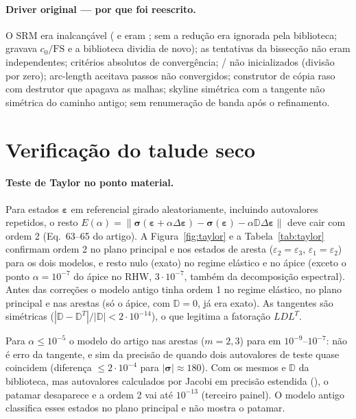 \documentclass[11pt,a4paper]{article}
\newcommand{\sig}{\bm{\sigma}}
\newcommand{\eps}{\bm{\varepsilon}}
\newcommand{\D}{\mathbb{D}}
\begin{document}
\paragraph{Driver original --- por que foi reescrito.} O SRM era inalcançável ( e
 eram ; sem  a redução era ignorada pela biblioteca;
 gravava $c_0/\text{FS}$ e a biblioteca dividia de novo); as tentativas da bissecção não
eram independentes; critérios absolutos de convergência; / não inicializados
(divisão por zero); arc-length aceitava passos não convergidos; construtor de cópia raso com destrutor
que apagava as malhas; skyline simétrica com a tangente não simétrica do caminho antigo; sem
renumeração de banda após o refinamento.

\section{Verificação do talude seco}\label{sec:verif}

\paragraph{Teste de Taylor no ponto material.} Para estados $\eps$ em referencial girado aleatoriamente,
incluindo autovalores repetidos, o resto
$E(\alpha)=\|\sig(\eps+\alpha\Delta\eps)-\sig(\eps)-\alpha\D\Delta\eps\|$ deve cair com ordem 2
(Eq.~63--65 do artigo). A Figura~\ref{fig:taylor} e a Tabela~\ref{tab:taylor} confirmam ordem 2 no plano
principal e nos estados de aresta ($\varepsilon_2=\varepsilon_3$, $\varepsilon_1=\varepsilon_2$) para os dois
modelos, e resto nulo (exato) no regime elástico e no ápice (exceto o ponto $\alpha=10^{-7}$ do ápice no RHW,
$3\cdot10^{-7}$, também da decomposição espectral). Antes das correções o modelo antigo tinha ordem 1 no
regime elástico, no plano principal e nas arestas (só o ápice, com $\D=0$, já era exato). As
tangentes são simétricas ($|\D-\D^T|/|\D|<2\cdot10^{-14}$), o que legitima a fatoração $LDL^T$.

Para $\alpha\le10^{-5}$ o modelo do artigo nas arestas ($m=2,3$) para em
$10^{-9}$--$10^{-7}$: não é erro da tangente, e sim da precisão de  quando
dois autovalores de teste quase coincidem (diferença $\le2\cdot10^{-4}$ para $|\sig|\approx180$). Com os
mesmos  e $\D$ da biblioteca, mas autovalores calculados por Jacobi em precisão
estendida (), o patamar desaparece e a ordem 2 vai até
$10^{-13}$ (terceiro painel). O modelo antigo classifica esses estados no plano principal e não mostra
o patamar.
\end{document}
